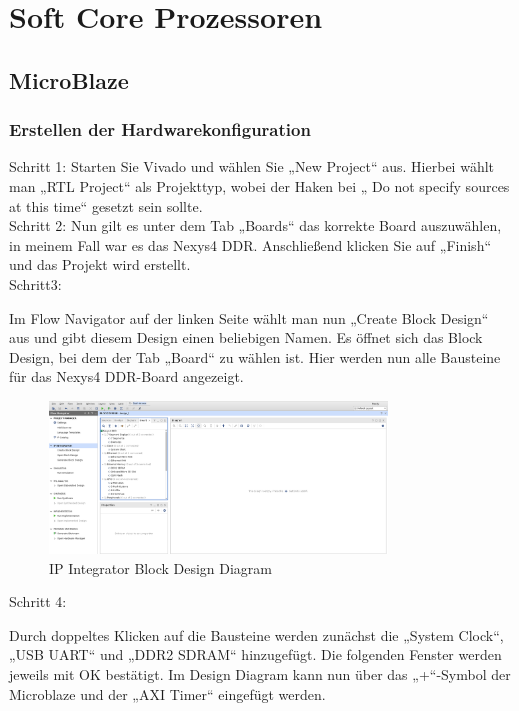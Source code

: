 
\chapter{Soft Core Prozessoren}\label{kap:softcoreprozessoren}
\newpage
\section{MicroBlaze}\label{kap:microblaze}



\subsection{Erstellen der Hardwarekonfiguration}\label{kap:microblazehardware}


Schritt 1:
Starten Sie Vivado und wählen Sie „New Project“ aus.
Hierbei wählt man „RTL Project“ als Projekttyp, wobei der Haken bei „ Do not specify sources at this time“ gesetzt sein sollte.\\

Schritt 2:
Nun gilt es unter dem Tab „Boards“ das korrekte Board auszuwählen, in meinem Fall war es das Nexys4 DDR.
Anschließend klicken Sie auf „Finish“ und das Projekt wird erstellt.\\


Schritt3:

Im Flow Navigator  auf der linken Seite wählt man nun „Create Block Design“ aus und
 gibt diesem Design einen beliebigen Namen.
Es öffnet sich das Block Design, bei dem der Tab „Board“ zu wählen ist. Hier werden nun
alle Bausteine für das Nexys4 DDR-Board angezeigt.\\

\begin{figure}[H]
\centering
\includegraphics[width=0.8\textwidth]{Hauptteil/schritt3.png}
\caption{IP Integrator Block Design Diagram}
\label{fig:mbschritt3}
\end{figure}

Schritt 4:

Durch doppeltes Klicken auf die Bausteine werden zunächst die „System Clock“, „USB UART“ und „DDR2 SDRAM“ hinzugefügt. Die folgenden Fenster werden jeweils mit OK bestätigt.
Im Design Diagram kann nun über das „+“-Symbol der Microblaze und der „AXI Timer“ eingefügt werden.\\


